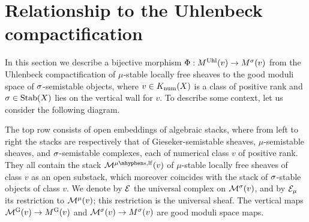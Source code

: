 
\section{Relationship to the Uhlenbeck compactification}
In this section we describe a bijective morphism $\Phi: M^{\mathrm{Uhl}}(v) \to M^\sigma(v)$ from the Uhlenbeck compactification of $\mu$-stable locally free sheaves to the good moduli space of $\sigma$-semistable objects, where $v \in K_{\mathrm{num}}(X)$ is a class of positive rank and $\sigma \in \operatorname{\mathrm{Stab}}(X)$ lies on the vertical wall for $v$. To describe some context, let us consider the following diagram.

\begin{center}
\end{center}
The top row consists of open embeddings of algebraic stacks, where from left to right the stacks are respectively that of Gieseker-semistable sheaves, $\mu$-semistable sheaves, and $\sigma$-semistable complexes, each of numerical class $v$ of positive rank. They all contain the stack $\sM^{\mu\mhyphen\mathrm{s}, \mathrm{lf}}(v)$ of $\mu$-stable locally free sheaves of class $v$ as an open substack, which moreover coincides with the stack of $\sigma$-stable objects of class $v$. We denote by $\mathcal{E}$ the universal complex on $\mathcal{M}^\sigma(v)$, and by $\mathcal{E}_\mu$ its restriction to $\mathcal{M}^{\mu}(v)$; this restriction is the universal sheaf. The vertical maps $\mathcal{M}^{\mathrm{G}}(v) \to M^{\mathrm{G}}(v)$ and $\mathcal{M}^\sigma(v) \to M^\sigma(v)$ are good moduli space maps.

